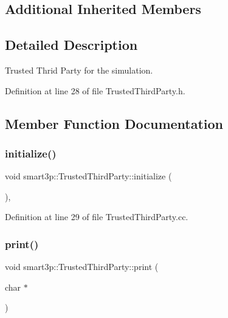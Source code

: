 \subsection*{Additional Inherited Members}


\subsection{Detailed Description}
Trusted Thrid Party for the simulation. 

Definition at line 28 of file Trusted\+Third\+Party.\+h.



\subsection{Member Function Documentation}
\mbox{\label{classsmart3p_1_1TrustedThirdParty_a07be5c50d1ec6307e02c20ee9829d0e4}} 
\subsubsection{\texorpdfstring{initialize()}{initialize()}}
{\footnotesize\ttfamily void smart3p\+::\+Trusted\+Third\+Party\+::initialize (\begin{DoxyParamCaption}{ }\end{DoxyParamCaption})\hspace{0.3cm}{\ttfamily [protected]}, {\ttfamily [virtual]}}



Definition at line 29 of file Trusted\+Third\+Party.\+cc.

\mbox{\label{classsmart3p_1_1TrustedThirdParty_aa6b9b6e4731061d43609acbf02ebbb81}} 
\subsubsection{\texorpdfstring{print()}{print()}}
{\footnotesize\ttfamily void smart3p\+::\+Trusted\+Third\+Party\+::print (\begin{DoxyParamCaption}\item[{char $\ast$}]{ }\end{DoxyParamCaption})}



